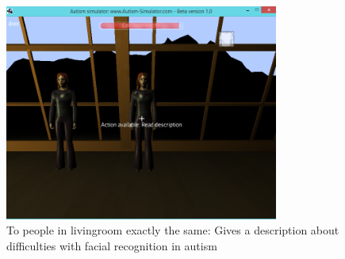 \documentclass[11pt]{report}
\begin{document}
\begin{figure}[H]
\centering
\includegraphics[width=90mm]{images/implementationfirst/gameimages/exploremode_people.png}
\caption{To people in livingroom exactly the same: Gives a description about difficulties with facial recognition in autism}
\label{old_house}
\end{figure}
\end{document}

